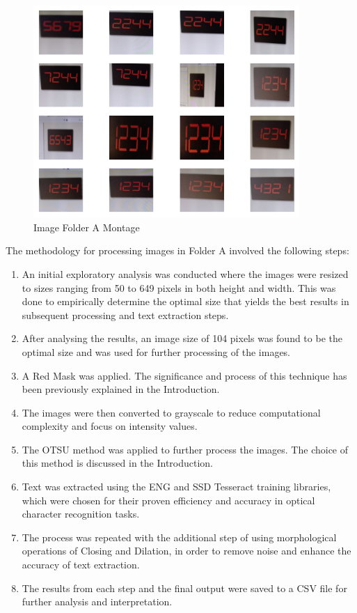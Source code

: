 \begin{figure}[ht]
    \centering
    \includegraphics[width=0.9\textwidth]{Figures/EDA_Charts/2/montage.png}
    \caption[Image Folder A Montage]{Image Folder A Montage}
    \label{fig:Image Folder A Montage}
\end{figure}

The methodology for processing images in Folder A involved the following steps:

\begin{enumerate}
    \item An initial exploratory analysis was conducted where the images were resized to sizes ranging from 50 to 649 pixels in both height and width. This was done to empirically determine the optimal size that yields the best results in subsequent processing and text extraction steps.
    \item After analysing the results, an image size of 104 pixels was found to be the optimal size and was used for further processing of the images.
    \item A Red Mask was applied. The significance and process of this technique has been previously explained in the Introduction.
    \item The images were then converted to grayscale to reduce computational complexity and focus on intensity values.
    \item The OTSU method was applied to further process the images. The choice of this method is discussed in the Introduction.
    \item Text was extracted using the ENG and SSD Tesseract training libraries, which were chosen for their proven efficiency and accuracy in optical character recognition tasks.
    \item The process was repeated with the additional step of using morphological operations of Closing and Dilation, in order to remove noise and enhance the accuracy of text extraction.
    \item The results from each step and the final output were saved to a CSV file for further analysis and interpretation.
\end{enumerate}

